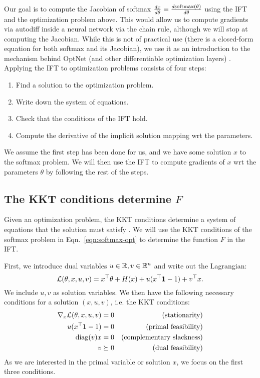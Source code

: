 \documentclass[11pt]{article}
\begin{document}
Our goal is to compute the Jacobian of softmax
$\frac{dx}{d\theta} = \frac{d\mathrm{softmax}(\theta)}{d\theta}$
using the IFT and the optimization problem above.
This would allow us to compute gradients via autodiff inside a
neural network via the chain rule,
although we will stop at computing the Jacobian.
While this is not of practical use (there is a closed-form equation
for both softmax and its Jacobian),
we use it as an introduction to the mechanism
behind OptNet (and other differentiable optimization layers)
\citep{optnet,agrawal2019diffcvx}.
Applying the IFT to optimization problems consists of four steps:
\begin{enumerate}
\item Find a solution to the optimization problem.
\item Write down the system of equations.
\item Check that the conditions of the IFT hold.
\item Compute the derivative of the implicit solution mapping wrt the parameters.
\end{enumerate}

We assume the first step has been done for us,
and we have some solution $x$ to the softmax problem.
We will then use the IFT to compute gradients of $x$ wrt the parameters $\theta$
by following the rest of the steps.

\subsection{The KKT conditions determine $F$}
Given an optimization problem, the KKT conditions determine a system of equations
that the solution must satisfy \citep{kkt-thesis,kkt}.
We will use the KKT conditions of the softmax problem in
Eqn.~\ref{eqn:softmax-opt} to determine the function $F$ in the IFT.

First, we introduce dual variables $u\in\mathbb{R},v\in\mathbb{R}^n$ and write out the Lagrangian:
$$\mathcal{L}(\theta, x, u, v) = x^\top\theta + H(x) + u(x^\top \mathbf{1} - 1) + v^\top x.$$
We include $u,v$ as solution variables.
We then have the following necessary conditions for a solution $(x,u,v)$,
i.e. the KKT conditions:
\begin{equation}
\begin{aligned}
\nabla_x \mathcal{L}(\theta, x,u,v) = 0 && \textrm{(stationarity)}\\
u(x^{\top} \mathbf{1} - 1) = 0 && \textrm{(primal feasibility)}\\
\mathrm{diag}(v)x = 0 && \textrm{(complementary slackness)}\\
v \succeq 0 && \textrm{(dual feasibility)}
\end{aligned}
\end{equation}
As we are interested in the primal variable or solution $x$,
we focus on the first three conditions.
\end{document}
